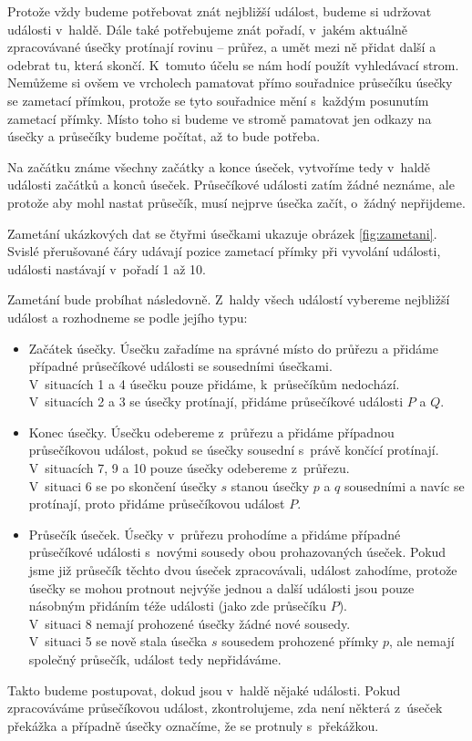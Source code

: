 Protože vždy budeme potřebovat znát nejbližší událost, budeme si udržovat
události v~haldě. Dále také potřebujeme znát pořadí, v~jakém aktuálně
zpracovávané úsečky protínají rovinu -- průřez, a umět mezi ně přidat další a
odebrat tu, která skončí. K~tomuto účelu se nám hodí použít vyhledávací strom.
Nemůžeme si ovšem ve vrcholech pamatovat přímo souřadnice průsečíku úsečky se
zametací přímkou, protože se tyto souřadnice mění s~každým posunutím zametací
přímky. Místo toho si budeme ve stromě pamatovat jen odkazy na úsečky a průsečíky
budeme počítat, až to bude potřeba.

Na začátku známe všechny začátky a konce úseček, vytvoříme tedy v~haldě události
začátků a konců úseček. Průsečíkové události zatím žádné neznáme, ale protože
aby mohl nastat průsečík, musí nejprve úsečka začít, o~žádný nepřijdeme.

Zametání ukázkových dat se čtyřmi úsečkami ukazuje obrázek \ref{fig:zametani}.
Svislé přerušované čáry udávají pozice zametací přímky při vyvolání události,
události nastávají v~pořadí 1 až 10.

Zametání bude probíhat následovně. Z~haldy všech událostí vybereme nejbližší
událost a rozhodneme se podle jejího typu:
\begin{itemize}
	\item {\tuc Začátek úsečky.}  Úsečku zařadíme na správné místo do
	průřezu a přidáme případné průsečíkové události se sousedními
	úsečkami.\\
	V~situacích 1 a 4 úsečku pouze přidáme, k~průsečíkům nedochází.\\
	V~situacích 2 a 3 se úsečky protínají, přidáme průsečíkové události
	$P$ a $Q$.

	\item {\tuc Konec úsečky.} Úsečku odebereme z~průřezu a přidáme
	případnou průsečíkovou událost, pokud se úsečky sousední s~právě
	končící protínají.\\
	V~situacích 7, 9 a 10 pouze úsečky odebereme z~průřezu.\\
	V~situaci 6 se po skončení úsečky $s$ stanou úsečky $p$ a $q$ sousedními
	a navíc se protínají, proto přidáme průsečíkovou událost $P$.
	\item {\tuc Průsečík úseček.} Úsečky v~průřezu prohodíme a přidáme
	případné průsečíkové události s~novými sousedy obou prohazovaných 
	úseček. Pokud jsme již průsečík těchto dvou úseček zpracovávali, událost
	zahodíme, protože úsečky se mohou protnout nejvýše jednou a další události
	jsou pouze násobným přidáním téže události (jako zde průsečíku $P$).\\
	V~situaci 8 nemají prohozené úsečky žádné nové sousedy.\\
	V~situaci 5 se nově stala úsečka $s$ sousedem prohozené přímky $p$, ale
	nemají společný průsečík, událost tedy nepřidáváme.
\end{itemize}
Takto budeme postupovat, dokud jsou v~haldě nějaké události. Pokud zpracováváme 
průsečíkovou událost, zkontrolujeme, zda není některá z~úseček překážka a 
případně úsečky označíme, že se protnuly s~překážkou. 


